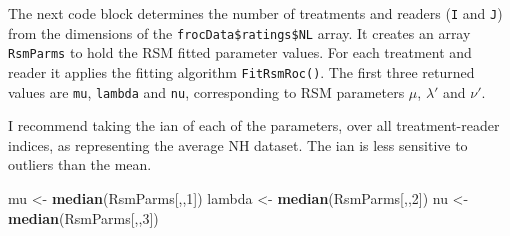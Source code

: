 \documentclass[
]{book}
\newenvironment{Shaded}{\begin{snugshade}}{\end{snugshade}}
\newcommand{\CommentTok}[1]{\textcolor[rgb]{0.56,0.35,0.01}{\textit{#1}}}
\newcommand{\ControlFlowTok}[1]{\textcolor[rgb]{0.13,0.29,0.53}{\textbf{#1}}}
\newcommand{\DataTypeTok}[1]{\textcolor[rgb]{0.13,0.29,0.53}{#1}}
\newcommand{\DecValTok}[1]{\textcolor[rgb]{0.00,0.00,0.81}{#1}}
\newcommand{\KeywordTok}[1]{\textcolor[rgb]{0.13,0.29,0.53}{\textbf{#1}}}
\newcommand{\NormalTok}[1]{#1}
\newcommand{\OperatorTok}[1]{\textcolor[rgb]{0.81,0.36,0.00}{\textbf{#1}}}
\newcommand{\StringTok}[1]{\textcolor[rgb]{0.31,0.60,0.02}{#1}}
\begin{document}
The next code block determines the number of treatments and readers (\texttt{I} and \texttt{J}) from the dimensions of the \texttt{frocData\$ratings\$NL} array. It creates an array \texttt{RsmParms} to hold the RSM fitted parameter values. For each treatment and reader it applies the fitting algorithm \texttt{FitRsmRoc()}. The first three returned values are \texttt{mu}, \texttt{lambda} and \texttt{nu}, corresponding to RSM parameters \({\mu}\), \({\lambda'}\) and \({\nu'}\).

\begin{Shaded}
\end{Shaded}

I recommend taking the ian of each of the parameters, over all treatment-reader indices, as representing the average NH dataset. The ian is less sensitive to outliers than the mean.

\begin{Shaded}
\begin{Highlighting}[]
\NormalTok{mu <-}\StringTok{ }\KeywordTok{median}\NormalTok{(RsmParms[,,}\DecValTok{1}\NormalTok{]) }
\NormalTok{lambda <-}\StringTok{ }\KeywordTok{median}\NormalTok{(RsmParms[,,}\DecValTok{2}\NormalTok{])}
\NormalTok{nu <-}\StringTok{ }\KeywordTok{median}\NormalTok{(RsmParms[,,}\DecValTok{3}\NormalTok{])}
\end{Highlighting}
\end{Shaded}
\end{document}
